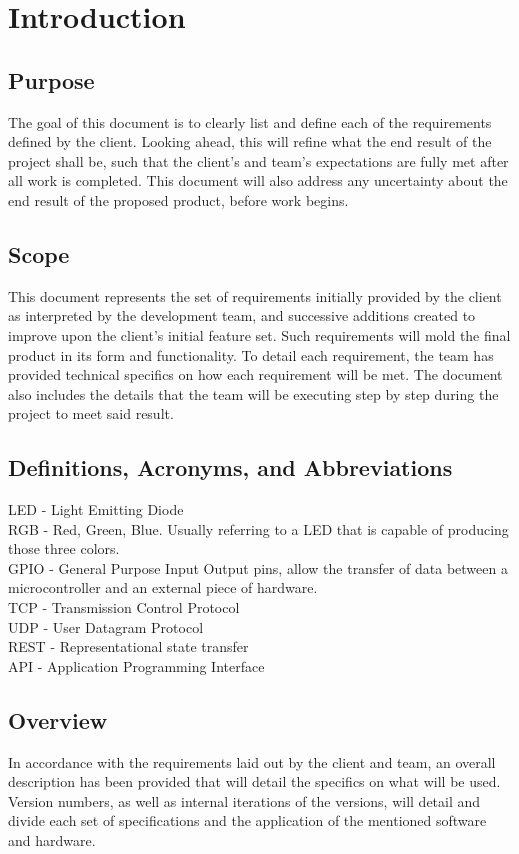 	\section{Introduction}

		\subsection{Purpose}
			The goal of this document is to clearly list and define each of the requirements defined by the client.  Looking ahead, this will refine what the end result of the project shall be,
			such that the client's and team's expectations are fully met after all work is completed.  This document will also address any uncertainty about the end result of the proposed product,
			before work begins.
		\subsection{Scope}
			This document represents the set of requirements initially provided by the client as interpreted by the development team, and successive additions created to improve upon the client's initial feature set.
			Such requirements will mold the final product in its form and functionality. To detail each requirement, the team has provided technical specifics on how each requirement will be met.  The document also
			includes the details that the team will be executing step by step	during the project to meet said result.

		\subsection{Definitions, Acronyms, and Abbreviations}
			LED - Light Emitting Diode
			\\RGB - Red, Green, Blue. Usually referring to a LED that is capable of producing those three colors.
			\\GPIO - General Purpose Input Output pins, allow the transfer of data between a microcontroller and an external piece of hardware.
			\\TCP - Transmission Control Protocol
			\\UDP - User Datagram Protocol
			\\REST - Representational state transfer
			\\API - Application Programming Interface


		\subsection{Overview}
			In accordance with the requirements laid out by the client and team, an overall description has been provided that will detail the specifics on what will be used. Version numbers, as well as internal iterations of the versions, will detail
			and divide each set of specifications and the application of the mentioned software and hardware.


